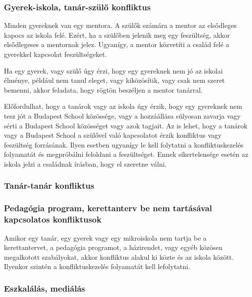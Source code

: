 \subsubsection{Gyerek-iskola, tanár-szülő
  konfliktus}\label{gyerek-iskola-tanuxe1r-szuxfclux151-konfliktus}

Minden gyereknek van egy mentora. A szülők számára a mentor az
elsődleges kapocs az iskola felé. Ezért, ha a szülőben jelenik meg egy
feszültség, akkor elsődlegeses a mentornak jelez. Ugyanígy, a mentor
közvetíti a család felé a gyerekkel kapcsolat feszültségeket.

Ha egy gyerek, vagy szülő úgy érzi, hogy egy gyereknek nem jó az iskolai
élménye, például nem tanul eleget, vagy kiközösítik, vagy csak nem
szeret bemenni, akkor feladata, hogy rögtön beszéljen a mentor tanárral.

Előfordulhat, hogy a tanárok vagy az iskola úgy érzik, hogy egy
gyereknek nem tesz jót a Budapest School közössége, vagy a hozzáállása
súlyosan zavarja vagy sérti a Budapest School közösséget vagy azok
tagjait. Az is lehet, hogy a tanárok vagy a Budapest School a szülővel
való kapcsolatot érzik konfliktus vagy feszültség forrásának. Ilyen
esetben ugyanígy le kell folytatni a konfliktuskezelés folyamatát és
megpróbálni feloldani a feszültséget. Ennek sikertelensége esetén az
iskola jelzi a családnak írásban, hogy el szeretne válni.

\subsubsection{Tanár-tanár
  konfliktus}\label{tanuxe1r-tanuxe1r-konfliktus}


\subsubsection{Pedagógia program, kerettanterv be nem tartásával
  kapcsolatos konfliktusok}

Amikor egy tanár, egy gyerek vagy egy mikroiskola nem tartja be a
kerettantervet, a pedagógia programot, a házirendet, vagy egyéb közösen
megalkotott szabályokat, akkor konfliktus alakul ki közte és az iskola
között. Ilyenkor szintén a konfliktuskezelés folyamatát kell
lefolytatni.

\subsubsection{Eszkalálás, mediálás}

